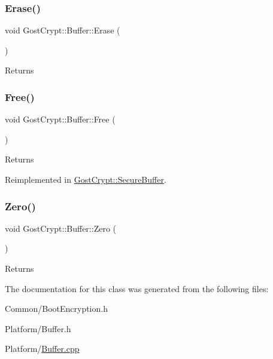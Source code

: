 \subsubsection{\texorpdfstring{Erase()}{Erase()}}
{\footnotesize\ttfamily void Gost\+Crypt\+::\+Buffer\+::\+Erase (\begin{DoxyParamCaption}{ }\end{DoxyParamCaption})\hspace{0.3cm}{\ttfamily [virtual]}}

\begin{DoxyReturn}{Returns}

\end{DoxyReturn}
\mbox{\label{class_gost_crypt_1_1_buffer_a80b126ff56504ad1d719dcad08c91e03}} 
\subsubsection{\texorpdfstring{Free()}{Free()}}
{\footnotesize\ttfamily void Gost\+Crypt\+::\+Buffer\+::\+Free (\begin{DoxyParamCaption}{ }\end{DoxyParamCaption})\hspace{0.3cm}{\ttfamily [virtual]}}

\begin{DoxyReturn}{Returns}

\end{DoxyReturn}


Reimplemented in \hyperlink{class_gost_crypt_1_1_secure_buffer_abaf33112f3fc29a54177f2f32e0148e8}{Gost\+Crypt\+::\+Secure\+Buffer}.

\mbox{\label{class_gost_crypt_1_1_buffer_ac878b08ad614264efcf6a2fc11fc83b5}} 
\subsubsection{\texorpdfstring{Zero()}{Zero()}}
{\footnotesize\ttfamily void Gost\+Crypt\+::\+Buffer\+::\+Zero (\begin{DoxyParamCaption}{ }\end{DoxyParamCaption})\hspace{0.3cm}{\ttfamily [virtual]}}

\begin{DoxyReturn}{Returns}

\end{DoxyReturn}


The documentation for this class was generated from the following files\+:\begin{DoxyCompactItemize}
\item 
Common/Boot\+Encryption.\+h\item 
Platform/Buffer.\+h\item 
Platform/\hyperlink{_buffer_8cpp}{Buffer.\+cpp}\end{DoxyCompactItemize}

